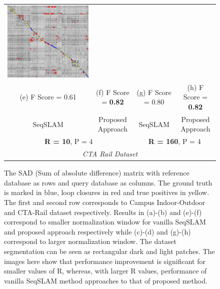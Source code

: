 \documentclass[letterpaper, 10 pt, conference]{ieeeconf}  %
\begin{document}
\begin{figure}
\begin{tabular*}{\textwidth}[t]{cccc}
  \includegraphics[width=\imgW,height=\imgH]{cta-rail-with-good-310} \\
  (e) F Score = 0.61 & (f) F Score = \textbf{0.82} & (g) F Score = 0.80 & (h) F Score = \textbf{0.82} \\
  SeqSLAM & Proposed Approach & SeqSLAM & Proposed Approach \\
  \multicolumn{2}{c}{\textbf{R = 10}, P = 4} & \multicolumn{2}{c}{\textbf{R = 160}, P = 4} \\
  \multicolumn{4}{c}{\emph{CTA Rail Dataset}}
 \end{tabular*}
 \caption{The SAD (Sum of absolute difference) matrix with reference database as rows and query database as columns. The ground truth is marked in blue, loop closures in red and true positives in yellow. The first and second row corresponds to Campus Indoor-Outdoor and CTA-Rail dataset respectively. Results in (a)-(b) and (e)-(f) correspond to smaller normalization window for vanilla SeqSLAM and proposed approach respectively while (c)-(d) and (g)-(h) correspond to larger normalization window. The dataset segmentation can be seen as rectangular dark and light patches. The images here show that performance improvement is significant for smaller values of R, whereas, with larger R values, performance of vanilla SeqSLAM method approaches to that of proposed method.}
 \label{fig:sadMat}

\end{figure}
\end{document}
